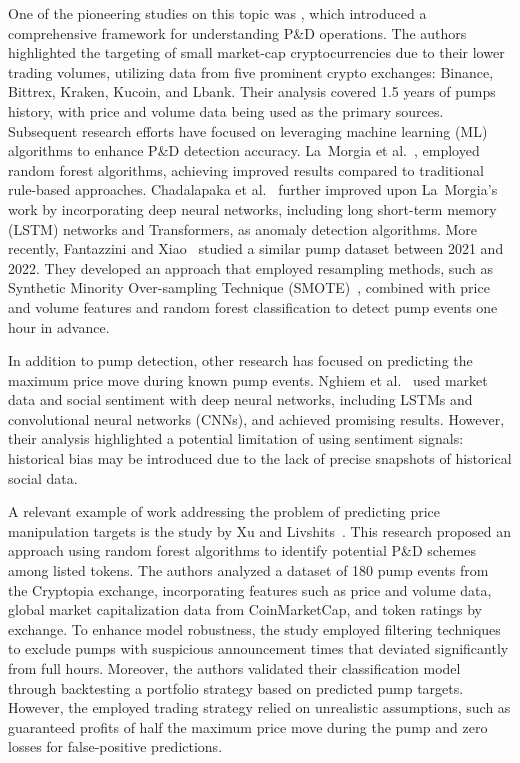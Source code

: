\documentclass{ieeeaccess}
\begin{document}
One of the pioneering studies on this topic was \cite{kamps_moon_2018}, which introduced a comprehensive framework for understanding P\&D operations. The authors highlighted the targeting of small market-cap cryptocurrencies due to their lower trading volumes, utilizing data from five prominent crypto exchanges: Binance, Bittrex, Kraken, Kucoin, and Lbank. Their analysis covered 1.5 years of pumps history, with price and volume data being used as the primary sources. Subsequent research efforts have focused on leveraging machine learning (ML) algorithms to enhance P\&D detection accuracy. La~Morgia et al.~\cite{la_morgia_pump_2020}, \cite{la2023doge} employed random forest algorithms, achieving improved results compared to traditional rule-based approaches. Chadalapaka et al.~\cite{chadalapaka_crypto_2022} further improved upon La~Morgia's work by incorporating deep neural networks, including long short-term memory (LSTM) networks and Transformers, as anomaly detection algorithms.
More recently, Fantazzini and Xiao~\cite{econometrics11030022} studied a similar pump dataset between 2021 and 2022. They developed an approach that employed resampling methods, such as Synthetic Minority Over-sampling Technique (SMOTE)~\cite{chawla2002smote}, combined with price and volume features and random forest classification to detect pump events one hour in advance.

In addition to pump detection, other research has focused on predicting the maximum price move during known pump events. Nghiem et al.~\cite{nghiem_2021} used market data and social sentiment with deep neural networks, including LSTMs and convolutional neural networks (CNNs), and achieved promising results. However, their analysis highlighted a potential limitation of using sentiment signals: historical bias may be introduced due to the lack of precise snapshots of historical social data.

A relevant example of work addressing the problem of predicting price manipulation targets is the study by Xu and Livshits~\cite{pd_anatomy}. This research proposed an approach using random forest algorithms to identify potential P\&D schemes among listed tokens. The authors analyzed a dataset of 180 pump events from the Cryptopia exchange, incorporating features such as price and volume data, global market capitalization data from CoinMarketCap, and token ratings by exchange. To enhance model robustness, the study employed filtering techniques to exclude pumps with suspicious announcement times that deviated significantly from full hours. Moreover, the authors validated their classification model through backtesting a portfolio strategy based on predicted pump targets. However, the employed trading strategy relied on unrealistic assumptions, such as guaranteed profits of half the maximum price move during the pump and zero losses for false-positive predictions.
\end{document}
